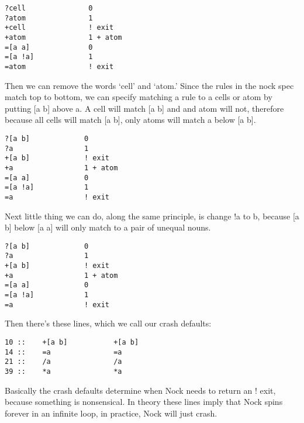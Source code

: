 \begin{framed_shaded}
\begin{Verbatim}[fontsize=\relsize{-2.5},fontseries=b,commandchars=\\\{\}]
?cell               0
?atom               1
+cell               ! exit
+atom               1 + atom
=[a a]              0 
=[a !a]             1
=atom               ! exit
\end{Verbatim}
\end{framed_shaded}
Then we can remove the words `cell' and `atom.' Since the rules in the nock spec match top to bottom, we can specify matching a rule to a cells or atom by putting [a b] above a. A cell will match [a b] and and atom will not, therefore because all cells will match [a b],
only atoms will match a below [a b].

\begin{framed_shaded}
\begin{Verbatim}[fontsize=\relsize{-2.5},fontseries=b,commandchars=\\\{\}]
?[a b]             0
?a                 1
+[a b]             ! exit
+a                 1 + atom
=[a a]             0 
=[a !a]            1
=a                 ! exit
\end{Verbatim}
\end{framed_shaded}

Next little thing we can do, along the same principle, is change !a to b, because [a b] below [a a] will only match to a pair of unequal nouns.

\begin{framed_shaded}
\begin{Verbatim}[fontsize=\relsize{-2.5},fontseries=b,commandchars=\\\{\}]
?[a b]             0
?a                 1
+[a b]             ! exit
+a                 1 + atom
=[a a]             0 
=[a !a]            1
=a                 ! exit
\end{Verbatim}
\end{framed_shaded}
Then there's these lines, which we call our crash defaults:

\begin{framed_shaded}
\begin{Verbatim}[fontsize=\relsize{-2.5},fontseries=b,commandchars=\\\{\}]
10 ::    +[a b]           +[a b]
14 ::    =a               =a
21 ::    /a               /a
39 ::    *a               *a
\end{Verbatim}
\end{framed_shaded}
Basically the crash defaults determine when Nock needs to return an ! exit, because something is nonsensical. In theory these lines imply that Nock spins forever in an infinite loop, in practice, Nock will just crash.

